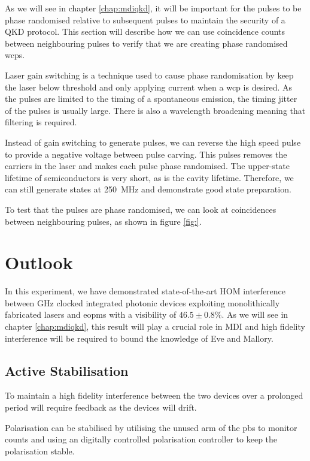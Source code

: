 {As we will see in chapter \ref{chap:mdiqkd}, it will be important for the pulses to be phase randomised relative to subsequent pulses to maintain the security of a \ac{QKD} protocol. This section will describe how we can use coincidence counts between neighbouring pulses to verify that we are creating phase randomised \acp{wcp}.

Laser gain switching is a technique used to cause phase randomisation by keep the laser below threshold and only applying current when a \ac{wcp} is desired. As the pulses are limited to the timing of a spontaneous emission, the timing jitter of the pulses is usually large. There is also a wavelength broadening meaning that filtering is required. 

Instead of gain switching to generate pulses, we can reverse the high speed pulse to provide a negative voltage between pulse carving. This pulses removes the carriers in the laser and makes each pulse phase randomised. The upper-state lifetime of semiconductors is very short, as is the cavity lifetime. Therefore, we can still generate states at \SI{250}{MHz} and demonstrate good state preparation.

To test that the pulses are phase randomised, we can look at coincidences between neighbouring pulses, as shown in figure \ref{fig:}.  

\section{Outlook}

In this experiment, we have demonstrated state-of-the-art \acl{HOM} interference between GHz clocked integrated photonic devices exploiting monolithically fabricated lasers and \acp{eopm} with a visibility of $46.5\pm 0.8\%$. As we will see in chapter \ref{chap:mdiqkd}, this result will play a crucial role in \ac{MDI} and high fidelity interference will be required to bound the knowledge of Eve and Mallory.

\subsection{Active Stabilisation}

To maintain a high fidelity interference between the two devices over a prolonged period will require feedback as the devices will drift. 

Polarisation can be stabilised by utilising the unused arm of the \ac{pbs} to monitor counts and using an digitally controlled polarisation controller to keep the polarisation stable.

}
